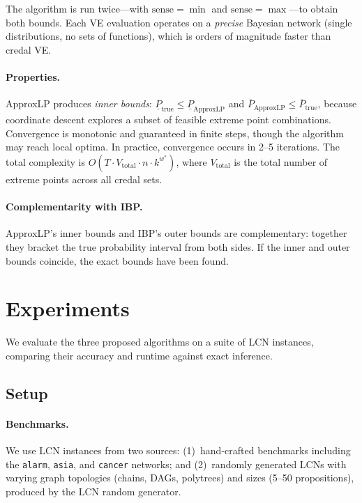 \documentclass{article}
\begin{document}
The algorithm is run twice---with $\text{sense} = \min$ and $\text{sense} = \max$---to obtain both bounds. Each VE evaluation operates on a \emph{precise} Bayesian network (single distributions, no sets of functions), which is orders of magnitude faster than credal VE.

\paragraph{Properties.} ApproxLP produces \emph{inner bounds}: $\underline{P}_{\text{true}} \leq \underline{P}_{\text{ApproxLP}}$ and $\overline{P}_{\text{ApproxLP}} \leq \overline{P}_{\text{true}}$, because coordinate descent explores a subset of feasible extreme point combinations. Convergence is monotonic and guaranteed in finite steps, though the algorithm may reach local optima. In practice, convergence occurs in 2--5 iterations. The total complexity is $O(T \cdot V_{\text{total}} \cdot n \cdot k^{w^*})$, where $V_{\text{total}}$ is the total number of extreme points across all credal sets.

\paragraph{Complementarity with IBP.} ApproxLP's inner bounds and IBP's outer bounds are complementary: together they bracket the true probability interval from both sides. If the inner and outer bounds coincide, the exact bounds have been found.


\section{Experiments}
\label{sec-experiments}

We evaluate the three proposed algorithms on a suite of LCN instances, comparing their accuracy and runtime against exact inference.

\subsection{Setup}

\paragraph{Benchmarks.} We use LCN instances from two sources: (1)~hand-crafted benchmarks including the \texttt{alarm}, \texttt{asia}, and \texttt{cancer} networks; and (2)~randomly generated LCNs with varying graph topologies (chains, DAGs, polytrees) and sizes (5--50 propositions), produced by the LCN random generator.
\end{document}
